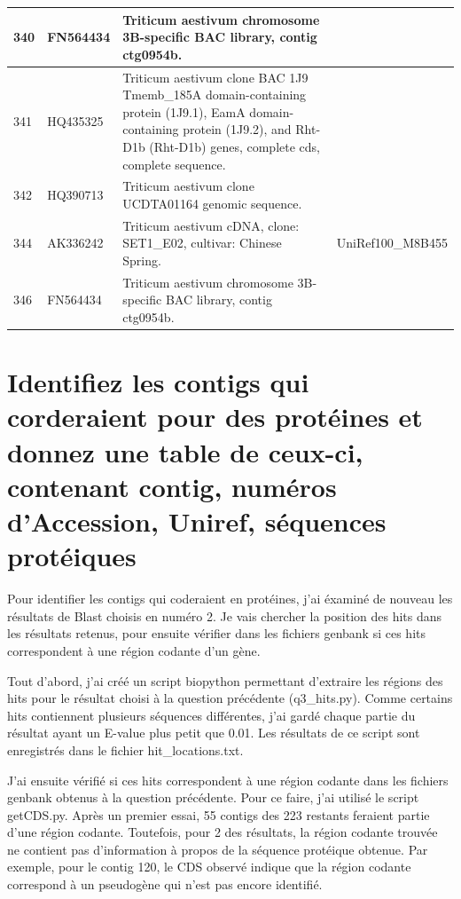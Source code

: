 \documentclass[10.9pt]{article} %
\begin{document}
{\begin{longtable}{|p{1.5cm}|p{2cm}|p{9cm}|p{3cm}|}
340 & FN564434 & Triticum aestivum chromosome 3B-specific BAC library, contig ctg0954b. & \\
\hline
341 & HQ435325 & Triticum aestivum clone BAC 1J9 Tmemb\_185A domain-containing protein (1J9.1), EamA domain-containing protein (1J9.2), and Rht-D1b (Rht-D1b) genes, complete cds, complete sequence. & \\
\hline
342 & HQ390713 & Triticum aestivum clone UCDTA01164 genomic sequence. & \\
\hline
344 & AK336242 & Triticum aestivum cDNA, clone: SET1\_E02, cultivar: Chinese Spring. & UniRef100\_M8B455\\
\hline
346 & FN564434 & Triticum aestivum chromosome 3B-specific BAC library, contig ctg0954b. & \\
\hline
\end{longtable}
}
\endgroup


 
\section{Identifiez les contigs qui corderaient pour des protéines et donnez une table de ceux-ci,
contenant contig, numéros d'Accession, Uniref, séquences protéiques} %

Pour identifier les contigs qui coderaient en protéines, j'ai éxaminé de nouveau les résultats de 
Blast choisis en numéro 2. Je vais chercher la position des hits dans les résultats retenus, pour
ensuite vérifier dans les fichiers genbank si ces hits correspondent à une région codante d'un gène.

Tout d'abord, j'ai créé un script biopython permettant d'extraire les régions des hits pour le résultat
choisi à la question précédente (q3\_hits.py). Comme certains hits contiennent plusieurs séquences
différentes, j'ai gardé chaque partie du résultat ayant un E-value plus petit que 0.01. Les résultats
de ce script sont enregistrés dans le fichier hit\_locations.txt.

J'ai ensuite vérifié si ces hits correspondent à une région codante dans les fichiers genbank obtenus
à la question précédente. Pour ce faire, j'ai utilisé le script getCDS.py. Après un premier essai,
55 contigs des 223 restants feraient partie d'une région codante. Toutefois, pour 2 des résultats, la
région codante trouvée ne contient pas d'information à propos de la séquence protéique obtenue. Par exemple,
pour le contig 120, le CDS observé indique que la région codante correspond à un pseudogène qui n'est pas
encore identifié.
\end{document}
